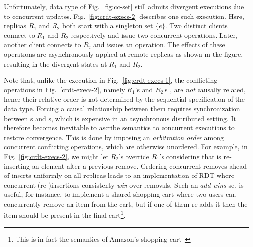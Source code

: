 Unfortunately,  data type of Fig.~\ref{fig:cc-set} still admits
divergent executions due to concurrent updates.
Fig.~\ref{fig:crdt-execs-2} describes one such execution. Here,
replicas $R_1$ and $R_2$ both start with a singleton set $\{e\}$.
Two distinct clients connect to $R_1$ and $R_2$ respectively and issue
two concurrent  operations. Later, another
client connects to $R_2$ and issues an  operation. The
effects of these operations are asynchronously applied at remote
replicas as shown in the figure, resulting in the divergent states at
$R_1$ and $R_2$.

Note that, unlike the execution in Fig.~\ref{fig:crdt-execs-1}, the
conflicting operations in Fig.~\ref{crdt-execs-2}, namely $R_1$'s
 and $R_2$'s , are \emph{not} causally related,
hence their relative order is not determined by the sequential
specification of the data type. Forcing a causal relationship between
them requires synchronization between s and s,
which is expensive in an asynchronous distributed setting. It
therefore becomes inevitable to ascribe semantics to concurrent
executions to restore convergence. This is done by imposing an
\emph{arbitration order} among concurrent conflicting operations,
which are otherwise unordered. For example, in
Fig.~\ref{fig:crdt-execs-2}, we might let $R_2$'s  override
$R_1$'s  considering that  is re-inserting an
element after a previous remove. Ordering concurrent removes ahead
of inserts uniformly on all replicas leads to an implementation of
 RDT where concurrent (re-)insertions consistenty \emph{win}
over removals. Such an \emph{add-wins} set is useful, for instance, to
implement a shared shopping cart where two users can concurrently
remove an item from the cart, but if one of them re-adds it then the
item should be present in the final cart\footnote{This is in fact the
semantics of Amazon's shopping cart~\cite{dynamo}}.

